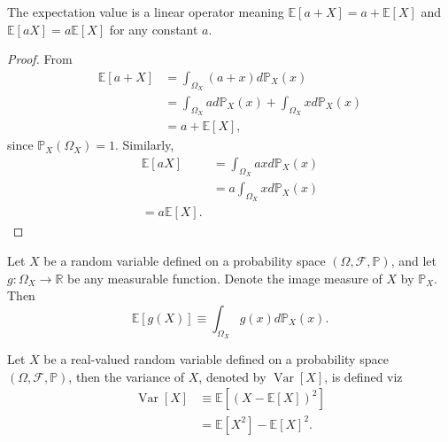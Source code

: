 \begin{theorem}
	\label{theorem:exp_linear}
	The expectation value is a linear operator meaning $\mathbb{E}[a+X] = a+\mathbb{E}[X]$ and $\mathbb{E}[aX] = a\mathbb{E}[X]$ for any constant $a$.
\end{theorem}
\begin{proof}
	From  
	\begin{equation}
		\begin{split}
			\mathbb{E}[a + X] &= \int_{\Omega_X}(a + x) d\mathbb{P}_X(x) \\ 
			&= \int_{\Omega_X} a d\mathbb{P}_X(x) + \int_{\Omega_X} x d\mathbb{P}_X(x)\\
			&= a + \mathbb{E}[X],
		\end{split}
	\end{equation}
	since $\mathbb{P}_X(\Omega_X) = 1$. Similarly,
	\begin{equation}
		\begin{split}
			\mathbb{E}[a X] &= \int_{\Omega_X} a x d\mathbb{P}_X(x) \\
			& = a \int_{\Omega_X} x d\mathbb{P}_X(x)\\
			 = a \mathbb{E}[X].
		\end{split}
	\end{equation}
\end{proof}

\begin{remark}
	\label{th:lotus}
	Let $X$ be a random variable defined on a probability space $(\Omega, \mathcal{F}, \mathbb{P})$, and let $g: \Omega_X \to \mathbb{R}$ be any measurable function. Denote the image measure of $X$ by $\mathbb{P}_X $. Then
	\begin{equation}
		\mathbb{E}[g(X)] \equiv \int_{\Omega_X} g(x)d\mathbb{P}_X(x).
		\label{eq:lotus_image}
	\end{equation}
\end{remark}

\begin{definition}[Variance]
	\label{def:variance}
	Let $X$ be a real-valued random variable defined on a probability space $(\Omega, \mathcal{F},\mathbb{P})$, then the variance of $X$, denoted by $\operatorname{Var}[X]$, is defined viz
	\begin{equation}
		\begin{split}
			\operatorname{Var}[X]&\equiv \mathbb{E}[(X-\mathbb{E}[X])^2]\\
			&= \mathbb{E}[X^2]-\mathbb{E}[X]^2.
		\end{split}
	\end{equation}
\end{definition}

